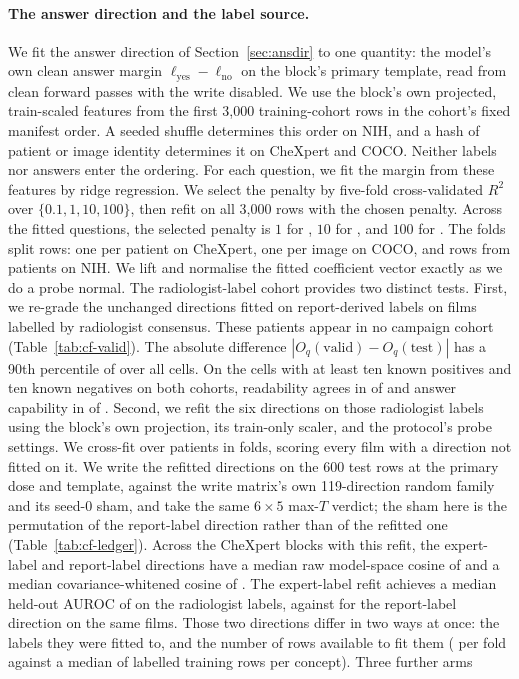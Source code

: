 \paragraph{The answer direction and the label source.} We fit the answer direction of Section~\ref{sec:ansdir} to one quantity: the model's own clean answer margin $\ell_{\mathrm{yes}}-\ell_{\mathrm{no}}$ on the block's primary template, read from clean forward passes with the write disabled. We use the block's own projected, train-scaled features from the first 3{,}000 training-cohort rows in the cohort's fixed manifest order. A seeded shuffle determines this order on NIH, and a hash of patient or image identity determines it on CheXpert and COCO. Neither labels nor answers enter the ordering. For each question, we fit the margin from these features by ridge regression. We select the penalty by five-fold cross-validated $R^2$ over $\{0.1,1,10,100\}$, then refit on all 3{,}000 rows with the chosen penalty. Across the \cfAnsAlphaCells{} fitted questions, the selected penalty is $1$ for \cfAnsAlphaOne{}, $10$ for \cfAnsAlphaTen{}, and $100$ for \cfAnsAlphaHundred{}. The folds split rows: one per patient on CheXpert, one per image on COCO, and rows from \cfAnsTrainUnitsNih{} patients on NIH. We lift and normalise the fitted coefficient vector exactly as we do a probe normal. The radiologist-label cohort provides two distinct tests. First, we re-grade the unchanged directions fitted on report-derived labels on \cfValidRows{} films labelled by radiologist consensus. These patients appear in no campaign cohort (Table~\ref{tab:cf-valid}). The absolute difference $|O_q(\text{valid})-O_q(\text{test})|$ has a 90th percentile of \cfValidNinetyDO{} over all cells. On the \cfValidSupported{} cells with at least ten known positives and ten known negatives on both cohorts, readability agrees in \cfValidReadableAgree{} of \cfValidReadableN{} and answer capability in \cfValidAnswerAgree{} of \cfValidAnswerN{}. Second, we refit the six directions on those radiologist labels using the block's own projection, its train-only scaler, and the protocol's probe settings. We cross-fit over patients in \cfValidfitFolds{} folds, scoring every film with a direction not fitted on it. We write the refitted directions on the 600 test rows at the primary dose and template, against the write matrix's own 119-direction random family and its seed-0 sham, and take the same $6\times5$ max-$T$ verdict; the sham here is the permutation of the report-label direction rather than of the refitted one (Table~\ref{tab:cf-ledger}). Across the \cfValidfitBlocks{} CheXpert blocks with this refit, the expert-label and report-label directions have a median raw model-space cosine of \cfValidfitCosRaw{} and a median covariance-whitened cosine of \cfValidfitCosWhitened{}. The expert-label refit achieves a median held-out AUROC of \cfValidfitAurocExpert{} on the radiologist labels, against \cfValidfitAurocReportDir{} for the report-label direction on the same films. Those two directions differ in two ways at once: the labels they were fitted to, and the number of rows available to fit them (\cfVfArmExpertRows{} per fold against a median of \cfVfArmReportFullRows{} labelled training rows per concept). Three further arms 